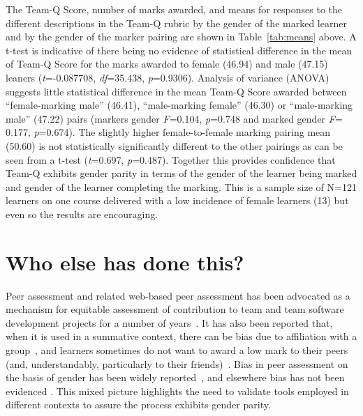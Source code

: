 \documentclass[sigconf, anonymous=false]{acmart}
\begin{document}
The Team-Q Score, number of marks awarded, and means for responses to
the different descriptions in the Team-Q rubric by the gender of the
marked learner and by the gender of the marker pairing are shown in
Table~\ref{tab:means} above. A t-test is indicative of there being no
evidence of statistical difference in the mean of Team-Q Score for the
marks awarded to female (46.94) and male (47.15) leaners
({\emph{t}}=-0.087708, {\emph{df}}=35.438,
{\emph{p}}=0.9306). Analysis of variance (ANOVA) suggests little
statistical difference in the mean Team-Q Score awarded between
``female-marking male'' (46.41), ``male-marking female'' (46.30) or
``male-marking male'' (47.22) pairs (markers gender {\emph{F}}=0.104,
{\emph{p}}=0.748 and marked gender {\emph{F}}= 0.177,
{\emph{p}}=0.674). The slightly higher female-to-female marking
pairing mean (50.60) is not statistically significantly different to
the other pairings as can be seen from a t-test ({\emph{t}}=0.697,
{\emph{p}}=0.487). Together this provides confidence that Team-Q
exhibits gender parity in terms of the gender of the learner being
marked and gender of the learner completing the marking. This is a
sample size of N=121 learners on one course delivered with a low
incidence of female learners (13) but even so the results are
encouraging.

\section{Who else has done this?}
Peer assessment and related web-based peer assessment has been
advocated as a mechanism for equitable assessment of contribution to
team and team software development projects for a number of
years~\cite{Clark2005,Raban_Litchfield_2007, Gordon2010,Fagerholm,
Britton2017,Philips21}. It has also been reported that, when it is
used in a summative context, there can be bias due to affiliation with
a group~\cite{Cestone2008}, and learners sometimes do not want to
award a low mark to their peers (and, understandably, particularly to
their friends)~\cite{Sridharam2003}. Bias in peer assessment on the
basis of gender has been widely
reported~\cite{Heels2019,Stonewall2018}, and elsewhere bias has not
been evidenced \cite{Tucker2014,Falchikov1997}. This mixed picture
highlights the need to validate tools employed in different contexts
to assure the process exhibits gender parity.
\end{document}
